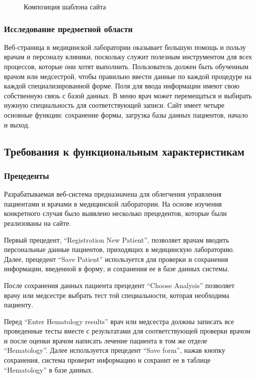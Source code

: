 \begin{figure}
\caption{Композиция шаблона сайта}
\label{img:pagp}
\end{figure}

\subsubsection{Исследование предметной области}

Веб-страница в медицинской лаборатории оказывает большую помощь и пользу врачам и персоналу клиники, поскольку служит полезным инструментом для всех процессов, которые они хотят выполнить.
Пользователь должен быть обученным врачом или медсестрой, чтобы правильно ввести данные по каждой процедуре на каждой специализированной форме.
Поля для ввода информации имеют свою собственную связь с базой данных.
В меню врач может перемещаться и выбирать нужную специальность для соответствующей записи. 
Сайт имеет четыре основные функции: сохранение формы, загрузка базы данных пациентов, начало и выход. 

\subsection{Требования к функциональным характеристикам}

\subsubsection{Прецеденты}

Разрабатываемая веб-система предназначена для облегчения управления пациентами и врачами в медицинской лаборатории. На основе изучения конкретного случая было выявлено несколько прецедентов, которые были реализованы на сайте.

Первый прецедент, ``Registration New Patient'', позволяет врачам вводить персональные данные пациентов, приходящих в медицинскую лабораторию. Далее, прецедент ``Save Patient'' используется для проверки и сохранения информации, введенной в форму, и сохранения ее в базе данных системы.

После сохранения данных пациента прецедент ``Choose Analysis'' позволяет врачу или медсестре выбрать тест той специальности, которая необходима пациенту. 

Перед ``Enter Hematology results'' врач или медсестра должны записать все проведенные тесты вместе с результатами для соответствующей проверки врачом и после оценки врачом написать лечение пациента в том же отделе ``Hematology''. Далее используется прецедент ``Save form'', нажав кнопку сохранения, система проверит информацию и сохранит ее в таблице ``Hematology'' в базе данных.

